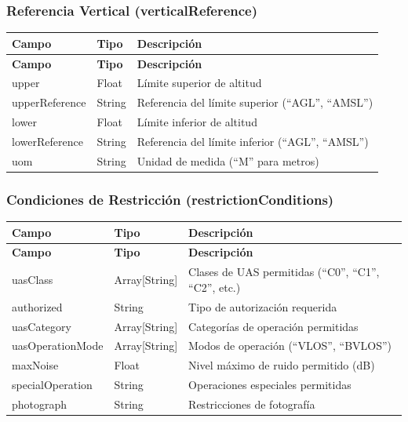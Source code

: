 \documentclass[12pt,a4paper]{article}
\begin{document}
\subsubsection{Referencia Vertical (verticalReference)}
\begin{longtable}{|p{4cm}|p{2.5cm}|p{8.5cm}|}
\hline
\textbf{Campo} & \textbf{Tipo} & \textbf{Descripción} \\
\hline
\endfirsthead
\hline
\textbf{Campo} & \textbf{Tipo} & \textbf{Descripción} \\
\hline
\endhead
\hline
\endfoot
\hline
\endlastfoot
upper & Float & Límite superior de altitud \\
\hline
upperReference & String & Referencia del límite superior (``AGL'', ``AMSL'') \\
\hline
lower & Float & Límite inferior de altitud \\
\hline
lowerReference & String & Referencia del límite inferior (``AGL'', ``AMSL'') \\
\hline
uom & String & Unidad de medida (``M'' para metros) \\
\hline
\end{longtable}

\subsubsection{Condiciones de Restricción (restrictionConditions)}
\begin{longtable}{|p{4cm}|p{2.5cm}|p{8.5cm}|}
\hline
\textbf{Campo} & \textbf{Tipo} & \textbf{Descripción} \\
\hline
\endfirsthead
\hline
\textbf{Campo} & \textbf{Tipo} & \textbf{Descripción} \\
\hline
\endhead
\hline
\endfoot
\hline
\endlastfoot
uasClass & Array[String] & Clases de UAS permitidas (``C0'', ``C1'', ``C2'', etc.) \\
\hline
authorized & String & Tipo de autorización requerida \\
\hline
uasCategory & Array[String] & Categorías de operación permitidas \\
\hline
uasOperationMode & Array[String] & Modos de operación (``VLOS'', ``BVLOS'') \\
\hline
maxNoise & Float & Nivel máximo de ruido permitido (dB) \\
\hline
specialOperation & String & Operaciones especiales permitidas \\
\hline
photograph & String & Restricciones de fotografía \\
\hline
\end{longtable}
\end{document}
